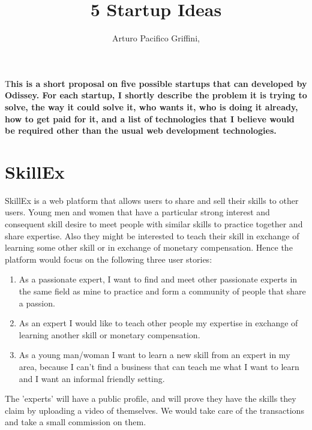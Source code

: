 \documentclass[DIV=calc, paper=a4, fontsize=11pt, twocolumn]{scrartcl}	 %
\title{5 Startup Ideas} %
\author{Arturo Pacifico Griffini, } %
\date{} %
\newcommand{\initial}[1]{ %
\lettrine[lines=3,lhang=0.3,nindent=0em]{
\color{DarkGoldenrod}
{\textsf{#1}}}{}}
\begin{document}
\maketitle %

\thispagestyle{fancy} %


\initial{T}\textbf{his is a short proposal on five possible startups that can developed by Odissey. For each startup, I shortly describe the problem it is trying to solve, the way it could solve it, who wants it, who is doing it already, how to get paid for it, and a list of technologies that I believe would be required other than the usual web development technologies. }


\section*{SkillEx}
SkillEx is a web platform that allows users to share and sell their skills to other users. Young men and women that have a particular strong interest and consequent skill desire to meet people with similar skills to practice together and share expertise. Also they might be interested to teach their skill in exchange of learning some other skill or in exchange of monetary compensation. Hence the platform would focus on the following three user stories:
\begin{enumerate}
\item As a passionate expert, I want to find and meet other passionate experts in the same field as mine to practice and form a community of people that share a passion.
\item As an expert I would like to teach other people my expertise in exchange of learning another skill or monetary compensation.
\item As a young man/woman I want to learn a new skill from an expert in my area, because I can't find a business that can teach me what I want to learn and I want an informal friendly setting.
\end{enumerate} 
The 'experts' will have a public profile, and will prove they have the skills they claim by uploading a video of themselves. We would take care of the transactions and take a small commission on them.
\end{document}
